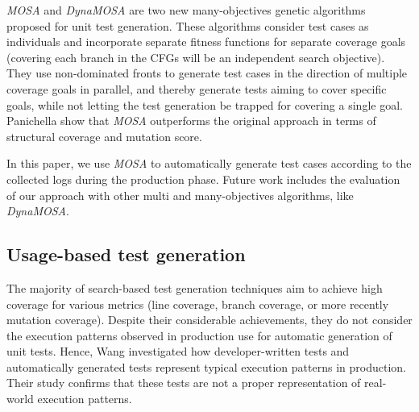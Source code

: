 
\textit{MOSA} \cite{Panichella2015} and \textit{DynaMOSA} \cite{Panichella2018} are two new many-objectives genetic algorithms proposed for unit test generation. These algorithms consider test cases as individuals and incorporate separate fitness functions for separate coverage goals (\eg covering each branch in the CFGs will be an independent search objective). They use non-dominated fronts to generate test cases in the direction of multiple coverage goals in parallel, and thereby generate tests aiming to cover specific goals, while not letting the test generation be trapped for covering a single goal. Panichella \etal \cite{Panichella2015} show that \textit{MOSA} outperforms the original \evosuite approach in terms of structural coverage and mutation score.

In this paper, we use \textit{MOSA} to automatically generate test cases according to the collected logs during the production phase. Future work includes the evaluation of our approach with other multi and many-objectives algorithms, like \textit{DynaMOSA}.

\subsection{Usage-based test generation}
\label{sec:cub:usage-based-test-generation}

The majority of search-based test generation techniques aim to achieve high coverage for various metrics (\eg line coverage, branch coverage, or more recently mutation coverage).
Despite their considerable achievements, they do not consider the execution patterns observed in production use for automatic generation of unit tests. Hence, Wang \etal \cite{Wang2017} investigated how developer-written tests and automatically generated tests represent typical execution patterns in production. Their study confirms that these tests are not a proper representation of real-world execution patterns.

